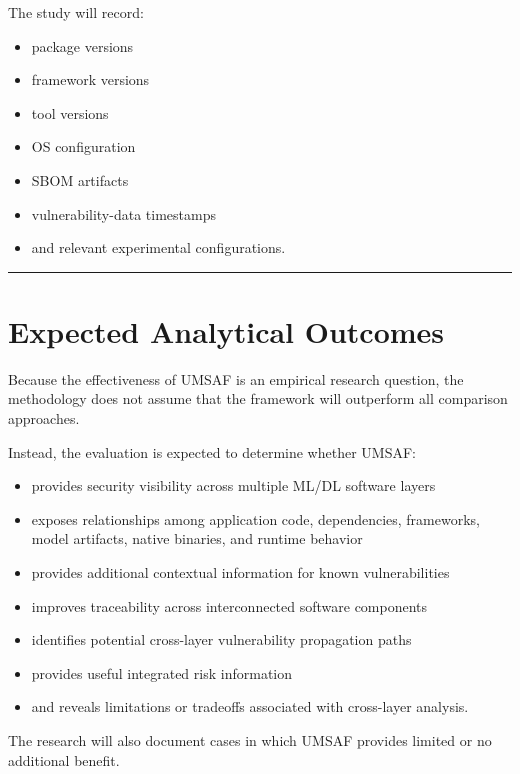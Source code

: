 \documentclass[
  12pt,
  letterpaper,
  oneside]{report}
\providecommand{\tightlist}{%
  \setlength{\itemsep}{0pt}\setlength{\parskip}{0pt}}
\begin{document}
The study will record:

\begin{itemize}
\tightlist
\item
  package versions
\item
  framework versions
\item
  tool versions
\item
  OS configuration
\item
  SBOM artifacts
\item
  vulnerability-data timestamps
\item
  and relevant experimental configurations.
\end{itemize}

\begin{center}\rule{0.5\linewidth}{0.5pt}\end{center}

\section{Expected Analytical Outcomes}\label{119-expected-analytical-outcomes}

Because the effectiveness of UMSAF is an empirical research question,
the methodology does not assume that the framework will outperform all
comparison approaches.

Instead, the evaluation is expected to determine whether UMSAF:

\begin{itemize}
\tightlist
\item
  provides security visibility across multiple ML/DL software layers
\item
  exposes relationships among application code, dependencies,
  frameworks, model artifacts, native binaries, and runtime behavior
\item
  provides additional contextual information for known vulnerabilities
\item
  improves traceability across interconnected software components
\item
  identifies potential cross-layer vulnerability propagation paths
\item
  provides useful integrated risk information
\item
  and reveals limitations or tradeoffs associated with cross-layer
  analysis.
\end{itemize}

The research will also document cases in which UMSAF provides limited or
no additional benefit.
\end{document}
